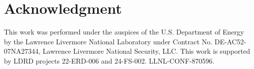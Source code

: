 \documentclass[conference]{IEEEtran}
\begin{document}
% 





\section*{Acknowledgment}
This work was performed under the auspices of the U.S. Department of Energy by the Lawrence Livermore National Laboratory under Contract No. DE-AC52-07NA27344, Lawrence Livermore National Security, LLC. This work is supported by LDRD projects 22-ERD-006 and 24-FS-002. LLNL-CONF-870596.






\vspace{12pt}
\end{document}
